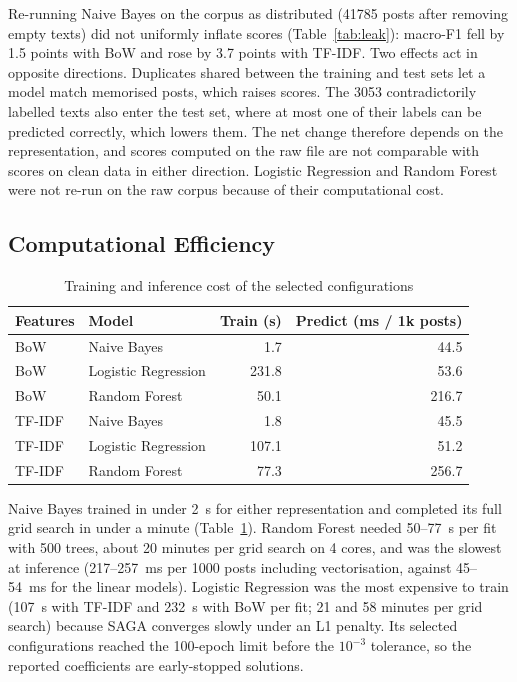 \documentclass[conference]{IEEEtran}
\begin{document}
Re-running Naive Bayes on the corpus as distributed (\num{41785} posts after removing empty texts) did not uniformly inflate scores (Table~\ref{tab:leak}): macro-F1 fell by 1.5 points with BoW and rose by 3.7 points with TF-IDF. Two effects act in opposite directions. Duplicates shared between the training and test sets let a model match memorised posts, which raises scores. The \num{3053} contradictorily labelled texts also enter the test set, where at most one of their labels can be predicted correctly, which lowers them. The net change therefore depends on the representation, and scores computed on the raw file are not comparable with scores on clean data in either direction. Logistic Regression and Random Forest were not re-run on the raw corpus because of their computational cost.

\subsection{Computational Efficiency}

\begin{table}[!htbp]
\centering
\caption{Training and inference cost of the selected configurations}
\label{tab:time}
\begin{tabular}{llrr}
\toprule
Features & Model & Train (s) & Predict (ms / 1k posts) \\
\midrule
BoW & Naive Bayes & 1.7 & 44.5 \\
BoW & Logistic Regression & 231.8 & 53.6 \\
BoW & Random Forest & 50.1 & 216.7 \\
TF-IDF & Naive Bayes & 1.8 & 45.5 \\
TF-IDF & Logistic Regression & 107.1 & 51.2 \\
TF-IDF & Random Forest & 77.3 & 256.7 \\
\bottomrule
\end{tabular}
\end{table}

Naive Bayes trained in under 2~s for either representation and completed its full grid search in under a minute (Table~\ref{tab:time}). Random Forest needed 50--77~s per fit with 500 trees, about 20 minutes per grid search on 4 cores, and was the slowest at inference (217--257~ms per \num{1000} posts including vectorisation, against 45--54~ms for the linear models). Logistic Regression was the most expensive to train (107~s with TF-IDF and 232~s with BoW per fit; 21 and 58 minutes per grid search) because SAGA converges slowly under an L1 penalty. Its selected configurations reached the 100-epoch limit before the $10^{-3}$ tolerance, so the reported coefficients are early-stopped solutions.
\end{document}
